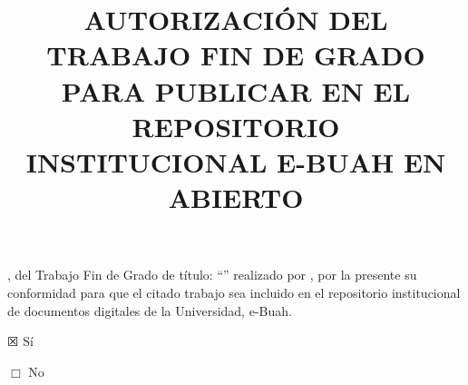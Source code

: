 \documentclass[11pt,a4paper,oneside]{article}
\title{AUTORIZACIÓN \MakeUppercase{\wordDelOrDeLos{} \wordTutorOrTutores} DEL TRABAJO FIN DE GRADO PARA PUBLICAR EN EL REPOSITORIO INSTITUCIONAL E-BUAH EN ABIERTO}             %
\date{}                                            %
\begin{document}

{\Large
\maketitle 

\thispagestyle{empty}


\myAdvisorsWithDonOrDona, \wordTutorOrTutores{} del Trabajo Fin de Grado de título:
``\myBookTitle'' realizado por \wordDonOrDonaAutor{} \myAuthorFullName, por la presente \wordDaOrDan{} su
conformidad para que el citado trabajo sea incluido en el repositorio
institucional de documentos digitales de la Universidad, e-Buah.

\vspace{1cm}

$\XBox$ Sí

\vspace{0.5cm}

$\Box$ No

\vspace{2cm}


\vspace{3cm}


}
\end{document}
